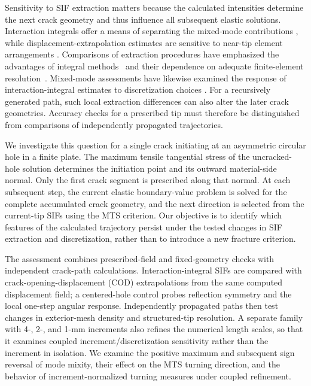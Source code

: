 \documentclass[pdflatex,sn-mathphys-num]{sn-jnl}
\begin{document}
Sensitivity to SIF extraction matters because the calculated
intensities determine the next crack geometry and thus influence
all subsequent elastic solutions. Interaction integrals offer
a means of separating the mixed-mode contributions
\cite{YauWangCorten1980}, while displacement-extrapolation
estimates are sensitive to near-tip element arrangements
\cite{GuineaPlanasElices2000}. Comparisons of extraction
procedures have emphasized the advantages of integral
methods~\cite{CourtinEtAl2005} and their dependence on
adequate finite-element resolution~\cite{QianEtAl2016}.
Mixed-mode assessments have likewise examined the response
of interaction-integral estimates to discretization choices
\cite{GhafooriAhangarVerreman2019}. For a recursively generated
path, such local extraction differences can also alter the
later crack geometries. Accuracy checks for a prescribed tip
must therefore be distinguished from comparisons of
independently propagated trajectories.

We investigate this question for a single crack initiating
at an asymmetric circular hole in a finite plate. The maximum
tensile tangential stress of the uncracked-hole solution determines
the initiation point and its outward material-side normal.
Only the first crack segment is prescribed along that normal.
At each subsequent step, the current elastic boundary-value
problem is solved for the complete accumulated crack geometry,
and the next direction is selected from the current-tip SIFs
using the MTS criterion. Our objective is to identify which features of the
calculated trajectory persist under the tested changes
in SIF extraction and discretization, rather than
to introduce a new fracture criterion.

\begingroup
\setlength{\emergencystretch}{1em}
The assessment combines prescribed-field and fixed-geometry
checks with independent crack-path calculations. Interaction-integral
SIFs are compared with crack-opening-displacement (COD)
extrapolations from the same computed displacement field; a
centered-hole control probes reflection symmetry and the local
one-step angular response. Independently propagated paths
then test changes in exterior-mesh density and structured-tip
resolution. A separate family with 4-, 2-, and 1-mm increments
also refines the numerical length scales, so that it examines
coupled increment/discretization sensitivity rather than the
increment in isolation. We examine the positive maximum and subsequent sign reversal
of mode mixity, their effect on the MTS turning direction,
and the behavior of increment-normalized turning measures
under coupled refinement.
\par\endgroup
\end{document}
